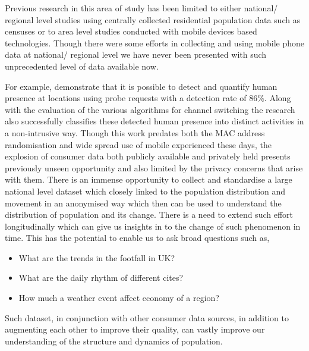 
Previous research in this area of study has been limited to either national/ regional level studies using centrally collected residential population data such as censuses or to area level studies conducted with mobile devices based technologies.
Though there were some efforts in collecting and using mobile phone data at national/ regional level we have never been presented with such unprecedented level of data available now.

For example, \citep{qin2013} demonstrate that it is possible to detect and quantify human presence at locations using probe requests with a detection rate of 86\%. 
Along with the evaluation of the various algorithms for channel switching the research also successfully classifies these detected human presence into distinct activities in a non-intrusive way. 
Though this work predates both the MAC address randomisation and wide spread use of mobile experienced these days, the explosion of consumer data both publicly available and privately held presents previously unseen opportunity and also limited by the privacy concerns that arise with them.
There is an immense opportunity to collect and standardise a large national level dataset which closely linked to the population distribution and movement in an anonymised way which then can be used to understand the distribution of population and its change.
There is a need to extend such effort  longitudinally which can give us insights in to the change of such phenomenon in time.
This has the potential to enable us to ask broad questions such as,

\begin{itemize}
  \setlength{\itemindent}{2em}
  \itemsep-0.25em
  \item What are the trends in the footfall in UK?
  \item What are the daily rhythm of different cites?
  \item How much a weather event affect economy of a region?
\end{itemize}

Such dataset, in conjunction with other consumer data sources, in addition to augmenting each other to improve their quality, can vastly improve our understanding of the structure and dynamics of population.

